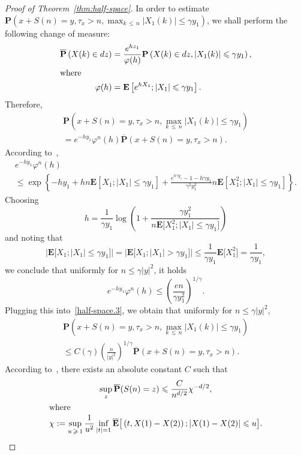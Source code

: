 \documentclass[10pt]{amsart}
\theoremstyle{definition}\newtheorem{defi}[theo]{Definition}\newtheorem{rema}[theo]{Remark}\newtheorem{exam}[theo]{Example}\newtheorem{exem}[theo]{Example}\newtheorem{nota}[theo]{Notation}
\newcommand{\pr}{\mathbf{P}}
\newcommand{\e}{\mathbf{E}}
\renewcommand{\le}{\leqslant}
\renewcommand{\ge}{\geqslant}
\begin{document}
\begin{proof}[Proof of Theorem~\ref{thm:half-space}]
In order to estimate $\pr(x+S(n)=y,\tau_x>n,\max_{k\,\le\,n}| X_1(k)|\le\gamma y_1)$, we shall perform the following change of measure:
\begin{align*}
\overline{\pr}\left(X(k)\in dz\right) &=\frac{e^{hz_1}}{\varphi(h)}\pr\left(X(k)\in dz,\left| X_1(k)\right|\le\gamma y_1\right),
\\
\intertext{where}
\varphi(h) &=\e\left[e^{hX_1};| X_1|\le \gamma y_1\right].
\end{align*}
Therefore,
\begin{multline}\label{half-space.3}
\pr\left(x+S(n)=y,\tau_x>n,\max_{k\,\le\,n}| X_1(k)|\le\gamma y_1\right)\\
=e^{-hy_1}\varphi^n(h)\overline{\pr}\left(x+S(n)=y,\tau_x>n\right).
\end{multline}
According to~\cite[Equation~(21)]{FuNa-71},
\begin{multline*}
e^{-hy_1}\varphi^n(h)\\
\le
\exp\left\{-hy_1+hn\e\left[X_1;|X_1|\le\gamma y_1\right]+\frac{e^{h\gamma y_1}-1-h\gamma y_1}{\gamma^2y_1^2} n\e\left[X_1^2;|X_1|\le\gamma y_1\right]\right\}.
\end{multline*}
Choosing
\begin{equation}\label{half-space.4}
h=\frac{1}{\gamma y_1}\log\left(1+\frac{\gamma y_1^2}{n\e\big[X_1^2;|X_1|\le\gamma y_1\big]}\right)
\end{equation}
and noting that
\[
\big|\e\big[X_1;|X_1|\le\gamma y_1\big]\big| =\big|\e\big[X_1;|X_1|>\gamma y_1\big]\big|
\le\frac{1}{\gamma y_1}\e\big[X_1^2\big]=\frac{1}{\gamma y_1},
\]
we conclude that uniformly for $n\le \gamma|y|^2$, it holds
\[
e^{-hy_1}\varphi^n(h)\le \left(\frac{en}{\gamma y_1^2}\right)^{1/\gamma}.
\]
Plugging this into~\eqref{half-space.3}, we obtain that uniformly for $n\le \gamma| y|^2$,
\begin{multline}\label{eq:half-space.5}
\pr\left(x+S(n)=y,\tau_x>n,\max_{k\,\le\,n}| X_1(k)|\le\gamma y_1\right)\\
\le C(\gamma)\left(\frac{n}{|y|^2}\right)^{1/\gamma}\overline{\pr}\left(x+S(n)=y,\tau_x>n\right).
\end{multline}
According to~\cite[Theorem~6.2]{Es-68}, there exists an absolute constant $C$ such that
\begin{gather*}
\sup_z\overline{\pr}(S(n)=z)\le\frac{C}{n^{d/2}}\chi^{-d/2},
\\
\intertext{where}
\chi:=\sup_{u\,\ge\,1}\frac{1}{u^2}\inf_{|t|=1}\overline{\e}\big[\left(t,X(1)-X(2)\right);\left| X(1)-X(2)\right|\le u\big].
\end{gather*}

\end{proof}
\end{document}
